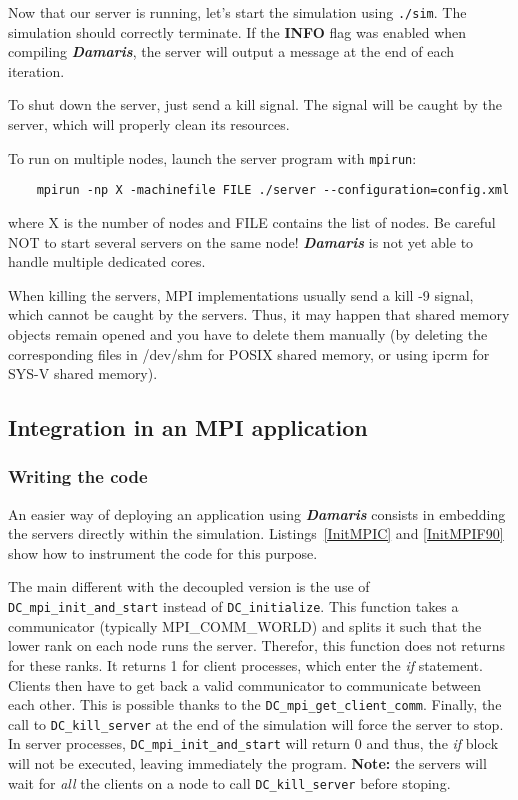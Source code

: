 \documentclass[11pt]{report}
\newcommand{\Damaris}{\emph{\textbf{Damaris}}}
\newcommand{\function}[1]{\texttt{#1}}
\begin{document}
Now that our server is running, let's start the simulation using \texttt{./sim}. The simulation should correctly terminate. If the \textbf{INFO} flag was enabled when compiling \Damaris{}, the server will output a message
at the end of each iteration.

To shut down the server, just send a kill signal. The signal will be caught by the server, which will
properly clean its resources.

To run on multiple nodes, launch the server program with \texttt{mpirun}:
\begin{verbatim}
	mpirun -np X -machinefile FILE ./server --configuration=config.xml
\end{verbatim}
where X is the number of nodes and FILE contains the list of nodes. Be careful NOT to start several servers
on the same node! \Damaris{} is not yet able to handle multiple dedicated cores.

When killing the servers, MPI implementations usually send a kill -9 signal, which cannot be caught by
the servers. Thus, it may happen that shared memory objects remain opened and you have to delete them
manually (by deleting the corresponding files in /dev/shm for POSIX shared memory, or using ipcrm for
SYS-V shared memory).

\clearpage
\subsection{Integration in an MPI application}

\subsubsection{Writing the code}

An easier way of deploying an application using \Damaris{} consists in embedding the servers
directly within the simulation. Listings~\ref{InitMPIC} and \ref{InitMPIF90} show how to instrument
the code for this purpose.

The main different with the decoupled version is the use of \function{DC\_mpi\_init\_and\_start} instead of
\function{DC\_initialize}. This function takes a communicator (typically MPI\_COMM\_WORLD)
and splits it such that the lower rank on each node runs the server. Therefor, this
function does not returns for these ranks. It returns 1 for client processes, which enter the \emph{if}
statement. Clients then have to get back a valid communicator to communicate between each other.
This is possible thanks to the \function{DC\_mpi\_get\_client\_comm}.
Finally, the call to \function{DC\_kill\_server} at the end of the simulation will force the server to stop.
In server processes, \function{DC\_mpi\_init\_and\_start} will return 0 and thus, the \emph{if} block will not
be executed, leaving immediately the program.
\textbf{Note:} the servers will wait for \emph{all} the clients on a node to call \function{DC\_kill\_server} 
before stoping.
\end{document}
